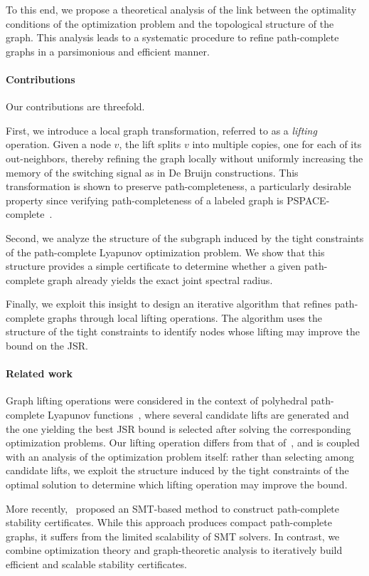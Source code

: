 \documentclass[letterpaper, 10 pt, conference]{ieeeconf}  %
\begin{document}
To this end, we propose a theoretical analysis of the link
between the optimality conditions of the optimization problem
and the topological structure of the graph. This analysis leads to a systematic
procedure to refine path-complete graphs in a parsimonious and efficient
manner. 
\paragraph*{Contributions} Our contributions are threefold.

First, we introduce a local graph transformation, referred to as a \emph{lifting} operation. Given a node $v$, the lift splits $v$ into multiple copies, one for each of its out-neighbors, thereby refining the graph locally without uniformly increasing the memory of the switching signal as in De Bruijn constructions. This transformation is shown to preserve path-completeness, a particularly desirable property since verifying path-completeness of a labeled graph is PSPACE-complete~\cite[Theorem~4]{jungers2017characterization}.

Second, we analyze the structure of the subgraph induced by the tight
constraints of the path-complete Lyapunov
optimization problem. We show that this structure provides a simple
certificate to determine whether a given path-complete graph already
yields the exact joint spectral radius.

Finally, we exploit this insight to design an iterative algorithm that
refines path-complete graphs through local lifting operations. The
algorithm uses the structure of the tight constraints to identify nodes
whose lifting may improve the bound on the JSR.
\paragraph*{Related work}
Graph lifting operations were considered in the context of
polyhedral path-complete Lyapunov functions~\cite{athanasopoulos2019polyhedral}, where several candidate lifts are
generated and the one yielding the best JSR bound is selected after
solving the corresponding optimization problems. Our lifting operation
differs from that of~\cite{athanasopoulos2019polyhedral}, and is coupled
with an analysis of the optimization problem itself: rather than
selecting among candidate lifts, we exploit the structure induced by
the tight constraints of the optimal solution to determine which lifting operation
may improve the bound.

More recently,~\cite{debauche2026} proposed an SMT-based method to construct path-complete stability certificates. While this approach produces compact path-complete graphs, it suffers from the limited scalability of SMT solvers. In contrast, we combine optimization theory and graph-theoretic analysis to iteratively build efficient and scalable stability certificates.
\end{document}
